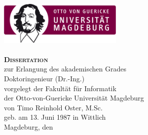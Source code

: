\begin{titlepage}
\setlength{\parindent}{0cm}%
\begin{Large}
\begin{centering}
\includegraphics[width=6cm]{figures/OvGU-Logo.jpg}\\
\vspace*{2cm}
{\scshape\bfseries\huge \thetitle}\\
\vspace*{2\baselineskip}
{\scshape\bfseries\LARGE Dissertation}\\
\vspace*{\baselineskip}
zur Erlangung des akademischen Grades\\
\vspace*{\baselineskip}
Doktoringenieur (Dr.-Ing.)\\
\vfill
vorgelegt der Fakultät für Informatik\\
der Otto-von-Guericke Universität Magdeburg\\
\vspace*{\baselineskip}
von Timo Reinhold Oster, M.Sc.\\
geb. am 13. Juni 1987 in Wittlich\\
\vspace*{\baselineskip}
Magdeburg, den \thedate\\
\end{centering}
\end{Large}
\end{titlepage}